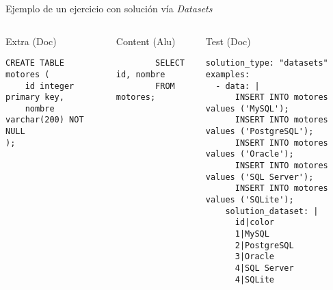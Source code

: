 Ejemplo de un ejercicio con solución vía \textit{Datasets}

\begin{columns}[t]
    \begin{listing}[H]
        \caption{Extra (Doc)}
        \begin{verbatim}
CREATE TABLE motores (
    id integer primary key,
    nombre varchar(200) NOT NULL
);
        \end{verbatim}
    \end{listing}

    \begin{listing}[H]
        \caption{Content (Alu)}
        \begin{verbatim}
        SELECT id, nombre
        FROM motores;
        \end{verbatim}
    \end{listing}

    \begin{listing}[H]
        \caption{Test (Doc)}
        \begin{verbatim}
solution_type: "datasets"
examples:
  - data: |
      INSERT INTO motores values ('MySQL');
      INSERT INTO motores values ('PostgreSQL');
      INSERT INTO motores values ('Oracle');
      INSERT INTO motores values ('SQL Server');
      INSERT INTO motores values ('SQLite');
    solution_dataset: |
      id|color
      1|MySQL
      2|PostgreSQL
      3|Oracle
      4|SQL Server
      4|SQLite
        \end{verbatim}
    \end{listing}

\end{columns}
